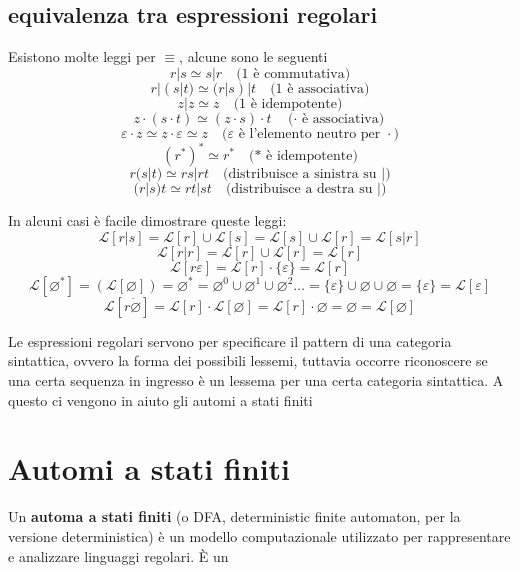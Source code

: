 \subsection{equivalenza tra espressioni regolari}

Esistono molte leggi per $\equiv$, alcune sono le seguenti 
\[
r | s \simeq s | r \quad \text{(1 è commutativa)}
\]
\[
r | (s | t) \simeq (r | s) | t \quad \text{(1 è associativa)}
\]
\[
z | z \simeq z \quad \text{(1 è idempotente)}
\]
\[
z \cdot (s \cdot t) \simeq (z \cdot s) \cdot t \quad \text{($\cdot$ è associativa)}
\]
\[
\varepsilon \cdot z \simeq z \cdot \varepsilon \simeq z \quad \text{($\varepsilon$ è l'elemento neutro per $\cdot$)}
\]
\[
(r^*)^* \simeq r^* \quad \text{(* è idempotente)}
\]
\[
r (s | t) \simeq r s | r t \quad \text{(distribuisce a sinistra su |)}
\]
\[
(r | s) t \simeq r t | s t \quad \text{(distribuisce a destra su |)}
\]

In alcuni casi è facile dimostrare queste leggi:
\[
    \mathcal{L}[r|s] =\mathcal{L}[r]\cup\mathcal{L}[s]=\mathcal{L}[s]\cup\mathcal{L}[r] = \mathcal{L}[s|r]    
\]
\[
    \mathcal{L}[r|r]=\mathcal{L}[r]\cup \mathcal{L}[r]=\mathcal{L}[r]
\]
\[
    \mathcal{L}[r\varepsilon] = \mathcal{L}[r]\cdot\{\varepsilon\}=\mathcal{L}[r]
\]
\[
    \mathcal{L}[\varnothing^*] = (\mathcal{L}[\varnothing]) = \varnothing^*=\varnothing^0\cup\varnothing^1\cup\varnothing^2\dots=\{\varepsilon\}\cup\varnothing\cup \varnothing=\{\varepsilon\}=\mathcal{L}[\varepsilon]    
\]
\[
    \mathcal{L}[r\dot \varnothing]=\mathcal{L}[r]\cdot\mathcal{L}[\varnothing]=\mathcal{L}[r]\cdot\varnothing=\varnothing=\mathcal{L}[\varnothing]    
\]

Le espressioni regolari servono per specificare il pattern di una categoria sintattica, ovvero la forma dei possibili lessemi, tuttavia occorre riconoscere se una certa sequenza in ingresso è un lessema per una certa categoria sintattica. A questo ci vengono in aiuto gli automi a stati finiti

\section{Automi a stati finiti}
Un \textbf{automa a stati finiti} (o DFA, deterministic finite automaton, per la versione deterministica) è un modello computazionale utilizzato per rappresentare e analizzare linguaggi regolari. È un 

